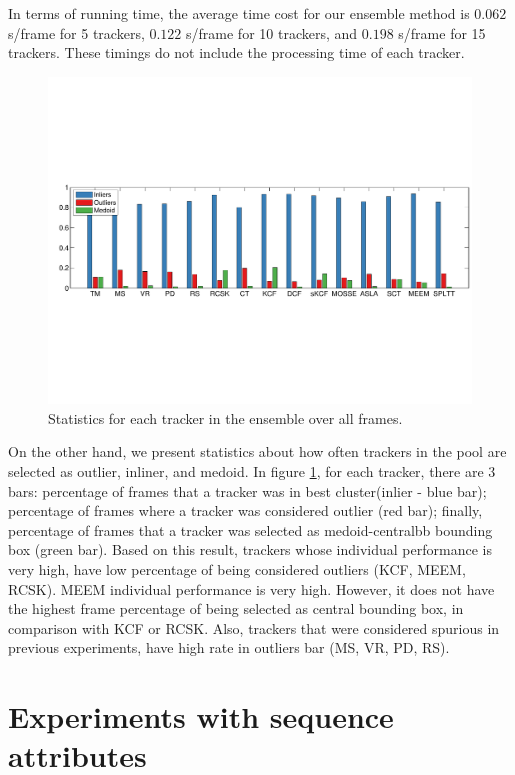 In terms of running time, the average time cost for our ensemble
method is $0.062$ s/frame for 5
trackers, $0.122$ s/frame for 10 trackers, and $0.198$ s/frame for 15 trackers.
These timings do not include the processing time of each tracker.

\begin{figure}[h!]
\centering
\includegraphics[width=1.0\linewidth, trim= 0.7cm 6.8cm 0.0cm 7.2cm, clip=true]{Figures/test.pdf}
\caption{\small Statistics for each tracker in the ensemble over all frames. }
\label{fig:stats}
\end{figure}

On the other hand, we present statistics about how often trackers in the pool
are selected as outlier, inliner, and medoid.
In figure
\ref{fig:stats}, for each tracker, there are 3 bars: percentage of frames that a
tracker was in best cluster(inlier - blue bar); percentage of frames where a
tracker was considered outlier (red bar); finally, percentage of frames that a
tracker was selected as medoid-centralbb bounding box (green bar). Based on this result,
trackers whose individual performance is very high, have low percentage of being
considered outliers (KCF, MEEM, RCSK). MEEM individual performance is very high.
However, it does not have the highest frame percentage of being selected as
central bounding box, in comparison with KCF or RCSK. Also, trackers that were
considered spurious in previous experiments, have high rate in outliers bar
(MS, VR, PD, RS). 

\section{Experiments with sequence attributes}

